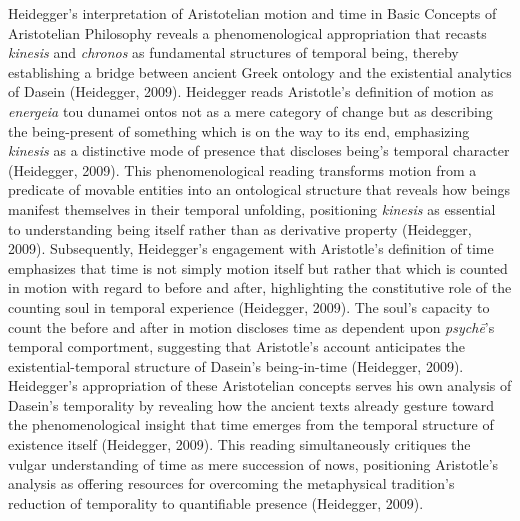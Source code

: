 \documentclass[12pt,a4paper]{article}
\begin{document}
Heidegger's interpretation of Aristotelian motion and time in Basic Concepts of Aristotelian Philosophy reveals a phenomenological appropriation that recasts \textit{kinesis} and \textit{chronos} as fundamental structures of temporal being, thereby establishing a bridge between ancient Greek ontology and the existential analytics of Dasein (Heidegger, 2009). Heidegger reads Aristotle's definition of motion as \textit{energeia} tou dunamei ontos not as a mere category of change but as describing the being-present of something which is on the way to its end, emphasizing \textit{kinesis} as a distinctive mode of presence that discloses being's temporal character (Heidegger, 2009). This phenomenological reading transforms motion from a predicate of movable entities into an ontological structure that reveals how beings manifest themselves in their temporal unfolding, positioning \textit{kinesis} as essential to understanding being itself rather than as derivative property (Heidegger, 2009). Subsequently, Heidegger's engagement with Aristotle's definition of time emphasizes that time is not simply motion itself but rather that which is counted in motion with regard to before and after, highlighting the constitutive role of the counting soul in temporal experience (Heidegger, 2009). The soul's capacity to count the before and after in motion discloses time as dependent upon \textit{psychē}'s temporal comportment, suggesting that Aristotle's account anticipates the existential-temporal structure of Dasein's being-in-time (Heidegger, 2009). Heidegger's appropriation of these Aristotelian concepts serves his own analysis of Dasein's temporality by revealing how the ancient texts already gesture toward the phenomenological insight that time emerges from the temporal structure of existence itself (Heidegger, 2009). This reading simultaneously critiques the vulgar understanding of time as mere succession of nows, positioning Aristotle's analysis as offering resources for overcoming the metaphysical tradition's reduction of temporality to quantifiable presence (Heidegger, 2009).
\end{document}

